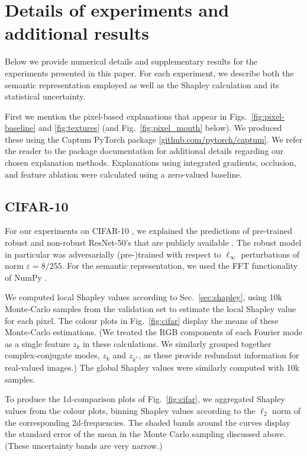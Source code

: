 \documentclass{article}
\DeclareRobustCommand{\Sec}[1]{Sec.~\ref{sec:#1}}
\DeclareRobustCommand{\Fig}[1]{Fig.~\ref{fig:#1}}
\DeclareRobustCommand{\Figs}[2]{Figs.~\ref{fig:#1} and \ref{fig:#2}}
\begin{document}
\newpage
\appendix
\section{Details of experiments and additional results}
\label{app:details}


Below we provide numerical details and  supplementary results for the experiments presented in this paper. For each experiment, we describe both the semantic representation employed as well as the Shapley calculation and its statistical uncertainty.

First we mention the pixel-based explanations that appear in \Figs{pixel-baseline}{textures} (and \Fig{pixel_mouth} below). We produced these using the Captum PyTorch package \url{[github.com/pytorch/captum]}. We refer the reader to the package documentation for additional details regarding our chosen explanation methods. Explanations using integrated gradients, occlusion, and feature ablation were calculated using a zero-valued baseline.


\subsection{CIFAR-10}
\label{app:cifar}


For our experiments on CIFAR-10 \citep{cifar10}, we explained the predictions of pre-trained robust and non-robust ResNet-50's that are publicly available \citep{robustness_github}. The robust model in particular was adversarially (pre-)trained with respect to $\ell_\infty$ perturbations of norm $\varepsilon = 8/255$. For the semantic representation, we used the FFT \citep{fft} functionality of NumPy \citep{numpy}.

We computed local Shapley values according to \Sec{shapley}, using 10k Monte-Carlo samples from the validation set to estimate the local Shapley value for each pixel. The colour plots in \Fig{cifar} display the means of these Monte-Carlo estimations. (We treated the RGB components of each Fourier mode as a single feature $z_k$ in these calculations. We similarly grouped together complex-conjugate modes, $z_k$ and $z_{k^*}$, as these provide redundant information for real-valued images.) The global Shapley values were similarly computed with 10k samples.

To produce the 1d-comparison plots of \Fig{cifar}, we aggregated Shapley values from the colour plots, binning Shapley values according to the $\ell_2$ norm of the corresponding 2d-frequencies. The shaded bands around the curves display the standard error of the mean in the Monte Carlo sampling discussed above. (These uncertainty bands are very narrow.)
\end{document}
